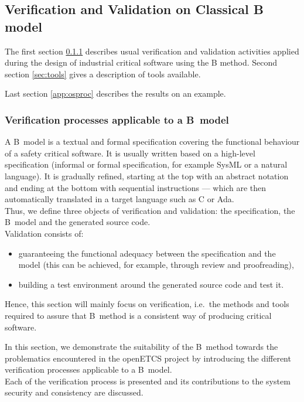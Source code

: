 \subsection{Verification and Validation on Classical B model}

The first section \ref{sec:processes} describes usual verification and validation activities applied during the design of industrial critical software using the B method. Second section \ref{sec:tools} gives a description of tools available.

Last section \ref{app:osproc} describes the results on an example.


\subsubsection{Verification processes applicable to a B~model}
\label{sec:processes}

A B~model is a textual and formal specification covering the functional behaviour of a safety critical software. It is usually written based on a high-level specification (informal or formal specification, for example SysML or a natural language). It is gradually refined, starting at the top with an abstract notation and ending at the bottom with sequential instructions --- which are then automatically translated in a target language such as C or Ada.\\
Thus, we define three objects of verification and validation: the specification, the B~model and the generated source code.\\


Validation consists of:
\begin{itemize}
\item guaranteeing the functional adequacy between the specification and the model (this can be achieved, for example, through review and proofreading),
\item building a test environment around the generated source code and test it.
\end{itemize}
Hence, this section will mainly focus on verification, i.e.\ the methods and tools required to assure that B~method is a consistent way of producing critical software.

In this section, we demonstrate the suitability of the B~method towards the problematics encountered in the openETCS project by introducing the different verification processes applicable to a B~model.\\
Each of the verification process is presented and its contributions to the system security and consistency are discussed.

